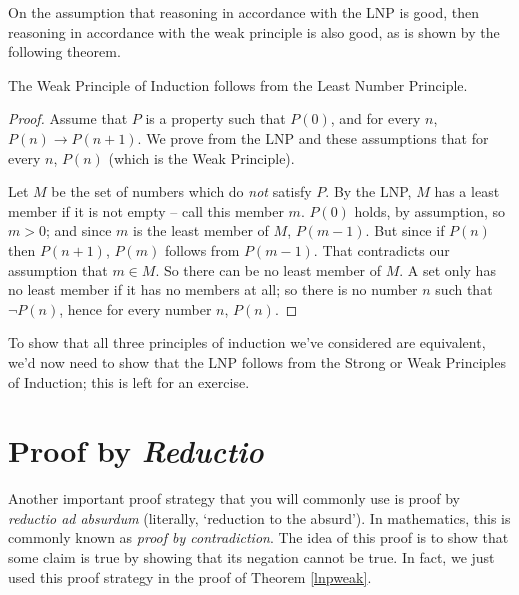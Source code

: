 On the assumption that reasoning in accordance with the LNP is good, then reasoning in accordance with the weak principle is also good, as is shown by the following theorem.
\begin{theorem} The Weak Principle of Induction \label{lnpweak}
  follows from the Least Number Principle. \begin{proof} Assume
 that $P$ is a 
  property such that $P(0)$, and for every $n$, $P(n) \to P(n+1)$. We prove from the LNP and these assumptions that for every $n$, $P(n)$ (which is the Weak
  Principle).
  
  Let $M$ be the set of numbers which do \emph{not} satisfy $P$. By the LNP, $M$ has a least member if it is not
  empty – call this member $m$. $P(0)$ holds, by
  assumption, so $m>0$; and since $m$ is the least member of $M$, $P(m-1)$. But since if $P(n)$ then $P(n+1)$,
  $P(m)$ follows from $P(m-1)$. That contradicts our assumption that $m \in
  M$. So there can be no least member of $M$. A set only has no least member if it has no
  members at all; so there is no number 
  $n$
  such that $\neg P(n)$, hence for every number $n$,
  $P(n)$.\end{proof}\end{theorem}

To show that all three principles of induction we've considered are equivalent, we'd now need to show that the LNP follows from the Strong or Weak Principles of Induction; this is left for an exercise.


\section{Proof by \emph{Reductio}}
Another important proof strategy that you will commonly use is proof by \emph{reductio ad absurdum} (literally, `reduction to the absurd'). In mathematics, this is commonly known as \emph{proof by contradiction}. The idea of this proof is to show that some claim is true by showing that its negation cannot be true. In fact, we just used this proof strategy in the proof of Theorem \ref{lnpweak}.

